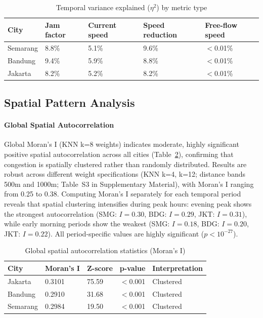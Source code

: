 \documentclass[review,authoryear]{elsarticle}
\begin{document}
\begin{longtable}[]{@{}lllll@{}}
\caption{Temporal variance explained ($\eta^2$) by metric type}\label{tab:speed_validation}\\
\toprule\noalign{}
City & Jam factor & Current speed & Speed reduction & Free-flow speed \\
\midrule\noalign{}
\endhead
\bottomrule\noalign{}
\endlastfoot
Semarang & 8.8\% & 5.1\% & 9.6\% & $<$0.01\% \\
Bandung & 9.4\% & 5.9\% & 8.8\% & $<$0.01\% \\
Jakarta & 8.2\% & 5.2\% & 8.2\% & $<$0.01\% \\
\end{longtable}

\subsection{Spatial Pattern Analysis}

\paragraph{Global Spatial Autocorrelation}

Global Moran's I (KNN k=8 weights) indicates moderate, highly significant positive spatial autocorrelation across all cities (Table~\ref{tab:table_moran}), confirming that congestion is spatially clustered rather than randomly distributed. Results are robust across different weight specifications (KNN k=4, k=12; distance bands 500m and 1000m; Table~S3 in Supplementary Material), with Moran's I ranging from 0.25 to 0.38. Computing Moran's I separately for each temporal period reveals that spatial clustering intensifies during peak hours: evening peak shows the strongest autocorrelation (SMG: $I=0.30$, BDG: $I=0.29$, JKT: $I=0.31$), while early morning periods show the weakest (SMG: $I=0.18$, BDG: $I=0.20$, JKT: $I=0.22$). All period-specific values are highly significant ($p < 10^{-27}$).

\FloatBarrier
\begin{longtable}[]{@{}lllll@{}}
\caption{Global spatial autocorrelation statistics (Moran's I)}\label{tab:table_moran}\\
\toprule\noalign{}
City & Moran's I & Z-score & p-value & Interpretation \\
\midrule\noalign{}
\endhead
\bottomrule\noalign{}
\endlastfoot
Jakarta & 0.3101 & 75.59 & $<$0.001 & Clustered \\
Bandung & 0.2910 & 31.68 & $<$0.001 & Clustered \\
Semarang & 0.2984 & 19.50 & $<$0.001 & Clustered \\
\end{longtable}
\FloatBarrier
\end{document}
